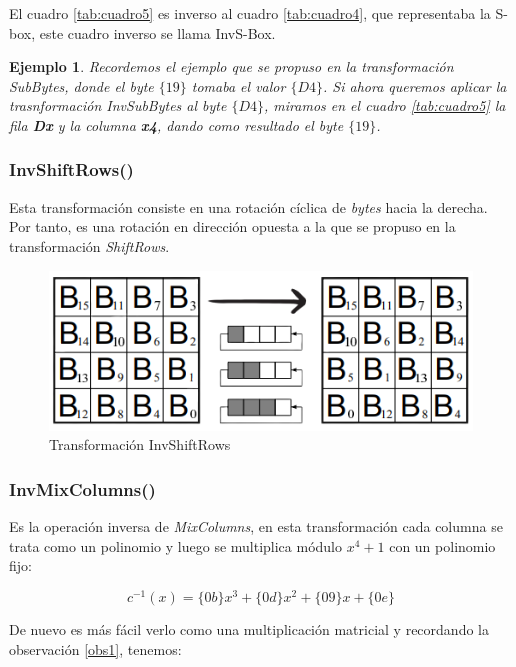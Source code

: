 \documentclass[peerreview]{IEEEtran}
\newtheorem{ejem}{\textbf{Ejemplo}}
\begin{document}
El cuadro \ref{tab:cuadro5} es inverso al cuadro \ref{tab:cuadro4}, que representaba la S-box, este cuadro inverso se llama InvS-Box.\\

\begin{ejem}
	Recordemos el ejemplo que se propuso en la transformación \textit{SubBytes}, donde el byte $\{19\}$ tomaba el valor $\{D4\}$. Si ahora queremos aplicar la trasnformación \textit{InvSubBytes} al byte $\{D4\}$, miramos en el cuadro \ref{tab:cuadro5} la fila \textbf{Dx} y la columna \textbf{x4}, dando como resultado el byte $\{19\}$.
\end{ejem}

\subsubsection{InvShiftRows()}
 Esta transformación consiste en una rotación cíclica de \textit{bytes} hacia la derecha. Por tanto, es una rotación en dirección opuesta a la que se propuso en la transformación \textit{ShiftRows}.
\begin{figure}[h]
	\includegraphics[scale=0.65]{figuras/InvShiftRows.png}
	\centering
	\caption{Transformación InvShiftRows}
	\label{fig: 8}
\end{figure}

\subsubsection{InvMixColumns()}
Es la operación inversa de \textit{MixColumns}, en esta transformación cada columna se trata como un polinomio y luego se multiplica módulo $x^4 + 1$ con un polinomio fijo:

\[c^{-1}(x)=\{0b\}x^3 + \{0d\}x^2 + \{09\}x + \{0e\}\]

De nuevo es más fácil verlo como una multiplicación matricial y recordando la observación \ref{obs1}, tenemos: \\
\end{document}
